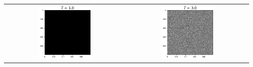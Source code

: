 \begin{frame}
\begin{columns}
\begin{column}{0.45\textwidth}
            \begin{tabular}{cc}
                \includegraphics[width=0.45\textwidth]{Immagini/Introduzione/cg_1000_1.0.png} &
                \includegraphics[width=0.45\textwidth]{Immagini/Introduzione/cg_1000_3.0.png} \\
            \end{tabular}
        
        \end{column}
      \end{columns}
  
\end{frame}



